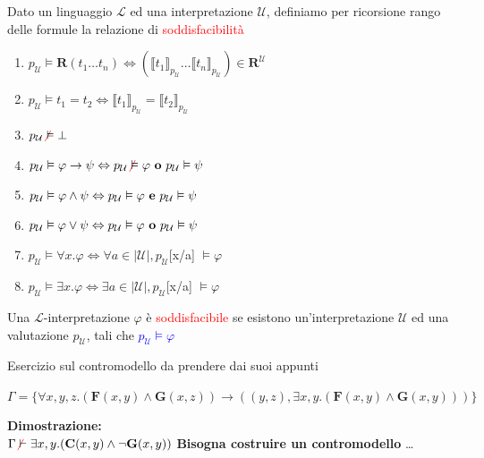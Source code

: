 \documentclass[a4paper, 12pt]{book}
\newcommand{\definizione}[2]{%
\vspace{15pt}%
\begin{tcolorbox}[
  colback=cyan!5!white,
  colframe=blue!50!black,
  title=\textbf{Definizione: #1}, %
  coltitle=white,
  fonttitle=\bfseries,
  arc=3mm,
  boxrule=0.5pt,
  enhanced,
  breakable
]
#2 %
\end{tcolorbox}
\vspace{15pt}%
}
\begin{document}
\definizione{Soddisfacibilità delle formule}{
  Dato un linguaggio $\mathcal{L}$ ed una interpretazione $\mathcal{U}$, definiamo per ricorsione rango delle formule la relazione di \textcolor{red}{soddisfacibilità}
  \begin{enumerate}
    \item $p_{\mathcal{U}} \vDash \textbf{R}(t_1 \dots t_n) \Leftrightarrow (\llbracket t_1 \rrbracket_{p_{\mathcal{U}}} \dots \llbracket t_n \rrbracket_{p_{\mathcal{U}}}) \in \textbf{R}^{\mathcal{U}}$ 
    \item $p_{\mathcal{U}} \vDash t_1 = t_2 \Leftrightarrow \llbracket t_1 \rrbracket_{p_{\mathcal{U}}} = \llbracket t_2 \rrbracket_{p_{\mathcal{U}}}$
    \item $p_{\mathcal{U}} \textcolor{red}{\not} \vDash \bot$ 
    \item $p_{\mathcal{U}} \vDash \varphi \rightarrow \psi \Leftrightarrow p_{\mathcal{U}} \textcolor{red}{\not} \vDash \varphi \text{ \textbf{o} } p_{\mathcal{U}} \vDash \psi$
    \item $p_{\mathcal{U}} \vDash \varphi \land \psi \Leftrightarrow p_{\mathcal{U}} \vDash \varphi \text{ \textbf{e} } p_{\mathcal{U}} \vDash \psi$
    \item $p_{\mathcal{U}} \vDash \varphi \lor \psi \Leftrightarrow p_{\mathcal{U}} \vDash \varphi \text{ \textbf{o} } p_{\mathcal{U}} \vDash \psi$
    \item $p_{\mathcal{U}} \vDash \forall x.\varphi \Leftrightarrow \forall a\in |\mathcal{U}|, p_{\mathcal{U}}$[x/a] $\vDash \varphi$
    \item $p_{\mathcal{U}} \vDash \exists x.\varphi \Leftrightarrow \exists a\in |\mathcal{U}|, p_{\mathcal{U}}$[x/a] $\vDash \varphi$
  \end{enumerate}

  Una $\mathcal{L}$-interpretazione $\varphi$ è \textcolor{red}{soddisfacibile} se esistono un'interpretazione $\mathcal{U}$ ed una valutazione $p_\mathcal{U}$, tali che \textcolor{blue}{$p_{\mathcal{U}} \vDash \varphi$}
}

Esercizio sul contromodello da prendere dai suoi appunti

\( \Gamma = \{ \forall x,y,z .(\textbf{F}(x,y) \land \textbf{G}(x,z)) \rightarrow ((y,z), \exists x, y .(\textbf{F}(x,y) \land \textbf{G}(x,y))) \} \)

\textbf{Dimostrazione:}\\
\( \Gamma \textcolor{red}{\not} \vdash \exists x,y.(\textbf{C}(x,y) \land \lnot \textbf{G}(x,y)) \)
\textbf{Bisogna costruire un contromodello}
\dots
\end{document}
